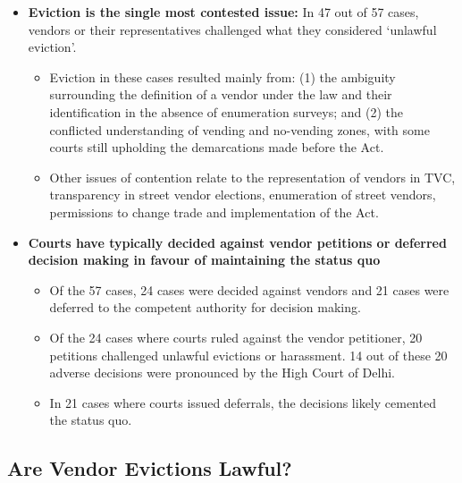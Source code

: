 \documentclass[a4paper, 12pt, twoside]{article}
\begin{document}
{\begin{itemize}
\item \textbf{Eviction is the single most contested issue:} In 47 out of 57 cases, vendors or their representatives challenged what they considered `unlawful eviction'.

\begin{itemize}
\item 	Eviction in these cases resulted mainly from: (1) the ambiguity surrounding the definition of a vendor under the law and their identification in the absence of enumeration surveys; and (2) the conflicted understanding of vending and no-vending zones, with some courts still upholding the demarcations made before the Act.

\item 	Other issues of contention relate to the representation of vendors in TVC, transparency in street vendor elections, enumeration of street vendors, permissions to change trade and implementation of the Act. 

\end{itemize}

\end{itemize}

\begin{itemize}
\item \textbf{Courts have typically decided against vendor petitions or deferred decision making in favour of maintaining the status quo} 

\begin{itemize}
\item 	Of the 57 cases, 24 cases were decided against vendors and 21 cases were deferred to the competent authority for decision making. 
\item 	Of the 24 cases where courts ruled against the vendor petitioner, 20 petitions challenged unlawful evictions or harassment. 14 out of these 20 adverse decisions were pronounced by the High Court of Delhi.
\item 	In 21 cases where courts issued deferrals, the decisions likely cemented the status quo.
\end{itemize}
\end{itemize}

\subsection*{Are Vendor Evictions Lawful?}

}
\end{document}
